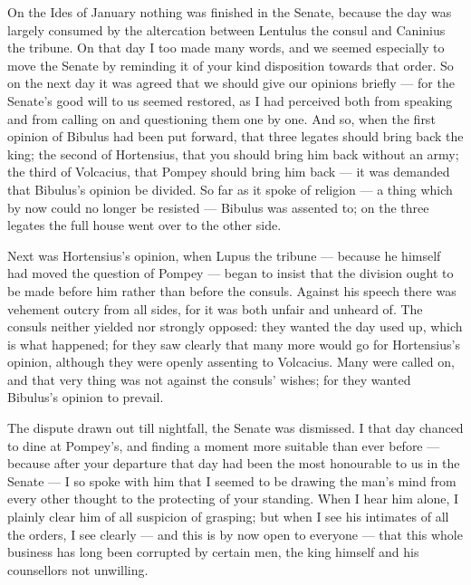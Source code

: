 

 On the Ides of January nothing was finished in the Senate, because the day was largely consumed by the altercation between Lentulus the consul and Caninius the tribune. On that day I too made many words, and we seemed especially to move the Senate by reminding it of your kind disposition towards that order. So on the next day it was agreed that we should give our opinions briefly --- for the Senate's good will to us seemed restored, as I had perceived both from speaking and from calling on and questioning them one by one. And so, when the first opinion of Bibulus had been put forward, that three legates should bring back the king; the second of Hortensius, that you should bring him back without an army; the third of Volcacius, that Pompey should bring him back --- it was demanded that Bibulus's opinion be divided. So far as it spoke of religion --- a thing which by now could no longer be resisted --- Bibulus was assented to; on the three legates the full house went over to the other side.

 Next was Hortensius's opinion, when Lupus the tribune --- because he himself had moved the question of Pompey --- began to insist that the division ought to be made before him rather than before the consuls. Against his speech there was vehement outcry from all sides, for it was both unfair and unheard of. The consuls neither yielded nor strongly opposed: they wanted the day used up, which is what happened; for they saw clearly that many more would go for Hortensius's opinion, although they were openly assenting to Volcacius. Many were called on, and that very thing was not against the consuls' wishes; for they wanted Bibulus's opinion to prevail.

 The dispute drawn out till nightfall, the Senate was dismissed. I that day chanced to dine at Pompey's, and finding a moment more suitable than ever before --- because after your departure that day had been the most honourable to us in the Senate --- I so spoke with him that I seemed to be drawing the man's mind from every other thought to the protecting of your standing. When I hear him alone, I plainly clear him of all suspicion of grasping; but when I see his intimates of all the orders, I see clearly --- and this is by now open to everyone --- that this whole business has long been corrupted by certain men, the king himself and his counsellors not unwilling.

